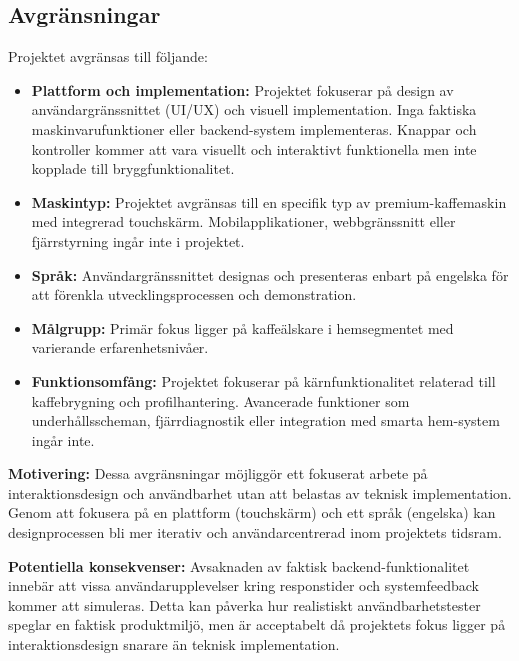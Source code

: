 \subsection{Avgränsningar}

Projektet avgränsas till följande:

\begin{itemize}
    \item \textbf{Plattform och implementation:} Projektet fokuserar på design av användargränssnittet (UI/UX) och visuell implementation. Inga faktiska maskinvarufunktioner eller backend-system implementeras. Knappar och kontroller kommer att vara visuellt och interaktivt funktionella men inte kopplade till bryggfunktionalitet.

    \item \textbf{Maskintyp:} Projektet avgränsas till en specifik typ av premium-kaffemaskin med integrerad touchskärm. Mobilapplikationer, webbgränssnitt eller fjärrstyrning ingår inte i projektet.

    \item \textbf{Språk:} Användargränssnittet designas och presenteras enbart på engelska för att förenkla utvecklingsprocessen och demonstration.

    \item \textbf{Målgrupp:} Primär fokus ligger på kaffeälskare i hemsegmentet med varierande erfarenhetsnivåer.

    \item \textbf{Funktionsomfång:} Projektet fokuserar på kärnfunktionalitet relaterad till kaffebrygning och profilhantering. Avancerade funktioner som underhållsscheman, fjärrdiagnostik eller integration med smarta hem-system ingår inte.
\end{itemize}

\textbf{Motivering:} Dessa avgränsningar möjliggör ett fokuserat arbete på interaktionsdesign och användbarhet utan att belastas av teknisk implementation. Genom att fokusera på en plattform (touchskärm) och ett språk (engelska) kan designprocessen bli mer iterativ och användarcentrerad inom projektets tidsram.

\textbf{Potentiella konsekvenser:} Avsaknaden av faktisk backend-funktionalitet innebär att vissa användarupplevelser kring responstider och systemfeedback kommer att simuleras. Detta kan påverka hur realistiskt användbarhetstester speglar en faktisk produktmiljö, men är acceptabelt då projektets fokus ligger på interaktionsdesign snarare än teknisk implementation.


